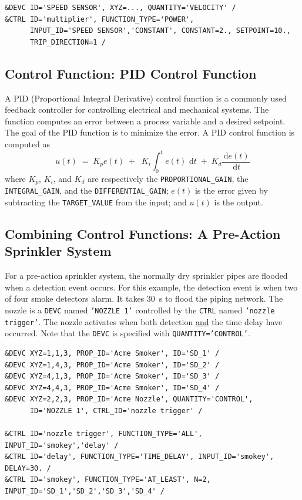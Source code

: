 \documentclass[11pt]{book}
\newcommand{\ct}{\tt\small}
\renewcommand{\d}{\,\mathrm{d}}
\newcommand{\be}{\begin{equation}}
\newcommand{\ee}{\end{equation}}
\begin{document}
\footnotesize
\begin{verbatim}
&DEVC ID='SPEED SENSOR', XYZ=..., QUANTITY='VELOCITY' /
&CTRL ID='multiplier', FUNCTION_TYPE='POWER',
      INPUT_ID='SPEED SENSOR','CONSTANT', CONSTANT=2., SETPOINT=10.,
      TRIP_DIRECTION=1 /
\end{verbatim} \normalsize


\subsection{Control Function: PID Control Function}
\label{info:CONTROL_PID}

A PID (Proportional Integral Derivative) control function is a commonly used feedback controller for controlling electrical and mechanical systems.  The function computes an error between a process variable and a desired setpoint.  The goal of the PID function is to minimize the error.  A PID control function is computed as
\be u(t) \; = \; K_p e(t) \; + \; \; K_i \int_0^t \! e(t) \, \d t   \; + \; K_d \frac{\d e(t)}{\d t}\ee
where $K_p$, $K_i$, and $K_d$ are respectively the {\ct PROPORTIONAL\_GAIN}, the {\ct INTEGRAL\_GAIN}, and the
{\ct DIFFERENTIAL\_GAIN}; $e(t)$ is the error given by subtracting the {\ct TARGET\_VALUE} from the input; and $u(t)$ is the output.

\subsection{Combining Control Functions: A Pre-Action Sprinkler System}

For a pre-action sprinkler system, the normally
dry sprinkler pipes are flooded when a detection event occurs. For this example, the detection event is
when two of four smoke detectors alarm.  It takes 30~s to flood the piping network.
The nozzle is a {\ct DEVC} named {\ct 'NOZZLE 1'} controlled by the {\ct CTRL} named {\ct 'nozzle trigger'}.
The nozzle activates when both detection \underline{and} the time delay have occurred.  Note that the {\ct DEVC} is
specified with {\ct QUANTITY='CONTROL'}.

\footnotesize
\begin{verbatim}
&DEVC XYZ=1,1,3, PROP_ID='Acme Smoker', ID='SD_1' /
&DEVC XYZ=1,4,3, PROP_ID='Acme Smoker', ID='SD_2' /
&DEVC XYZ=4,1,3, PROP_ID='Acme Smoker', ID='SD_3' /
&DEVC XYZ=4,4,3, PROP_ID='Acme Smoker', ID='SD_4' /
&DEVC XYZ=2,2,3, PROP_ID='Acme Nozzle', QUANTITY='CONTROL',
      ID='NOZZLE 1', CTRL_ID='nozzle trigger' /

&CTRL ID='nozzle trigger', FUNCTION_TYPE='ALL', INPUT_ID='smokey','delay' /
&CTRL ID='delay', FUNCTION_TYPE='TIME_DELAY', INPUT_ID='smokey', DELAY=30. /
&CTRL ID='smokey', FUNCTION_TYPE='AT_LEAST', N=2, INPUT_ID='SD_1','SD_2','SD_3','SD_4' /
\end{verbatim}
\normalsize
\end{document}
